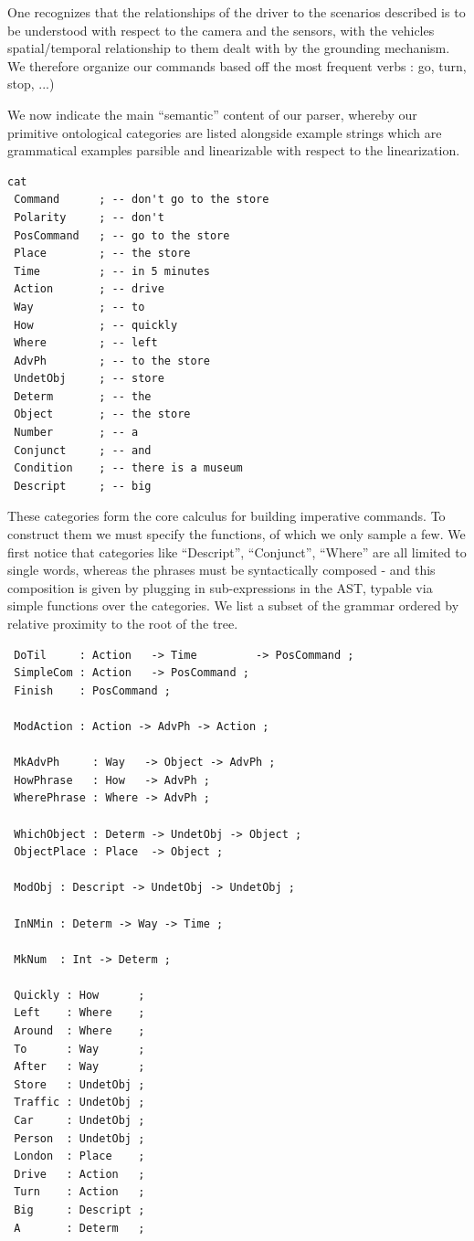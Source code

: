 \documentclass{article}
\begin{document}
One recognizes that the relationships of the driver to the scenarios described is to
be understood with respect to the camera and the sensors, with the vehicles spatial/temporal relationship to
them dealt with by the grounding mechanism. We therefore organize our commands
based off the most frequent verbs : go, turn, stop, ...)

We now indicate the main ``semantic'' content of our parser, whereby our
primitive ontological categories are listed alongside example strings which
are grammatical examples parsible and linearizable with respect to the
linearization.

\begin{verbatim}
cat
 Command      ; -- don't go to the store
 Polarity     ; -- don't
 PosCommand   ; -- go to the store
 Place        ; -- the store
 Time         ; -- in 5 minutes
 Action       ; -- drive
 Way          ; -- to
 How          ; -- quickly
 Where        ; -- left
 AdvPh        ; -- to the store
 UndetObj     ; -- store
 Determ       ; -- the
 Object       ; -- the store
 Number       ; -- a
 Conjunct     ; -- and
 Condition    ; -- there is a museum
 Descript     ; -- big
\end{verbatim}

These categories form the core calculus for building imperative commands. To
construct them we must specify the functions, of which we only sample a few. We
first notice that categories like ``Descript'', ``Conjunct'', ``Where'' are all
limited to single words, whereas the phrases must be syntactically composed - and
this composition is given by plugging in sub-expressions in the AST, typable via
simple functions over the categories. We list a subset of the grammar ordered by
relative proximity to the root of the tree.

\begin{verbatim}
 DoTil     : Action   -> Time         -> PosCommand ;
 SimpleCom : Action   -> PosCommand ;
 Finish    : PosCommand ;

 ModAction : Action -> AdvPh -> Action ;

 MkAdvPh     : Way   -> Object -> AdvPh ;
 HowPhrase   : How   -> AdvPh ;
 WherePhrase : Where -> AdvPh ;

 WhichObject : Determ -> UndetObj -> Object ;
 ObjectPlace : Place  -> Object ;

 ModObj : Descript -> UndetObj -> UndetObj ;

 InNMin : Determ -> Way -> Time ;

 MkNum  : Int -> Determ ;

 Quickly : How      ;
 Left    : Where    ;
 Around  : Where    ;
 To      : Way      ;
 After   : Way      ;
 Store   : UndetObj ;
 Traffic : UndetObj ;
 Car     : UndetObj ;
 Person  : UndetObj ;
 London  : Place    ;
 Drive   : Action   ;
 Turn    : Action   ;
 Big     : Descript ;
 A       : Determ   ;
\end{verbatim}
\end{document}
